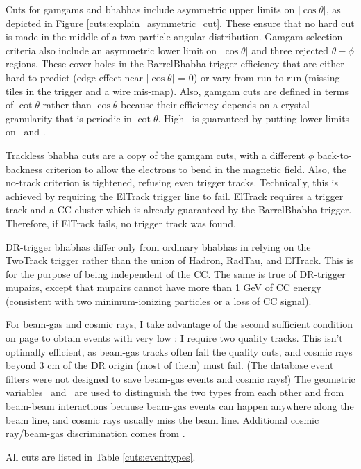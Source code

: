 Cuts for gamgams and bhabhas include asymmetric upper limits on
$|\cos\theta|$, as depicted in Figure \ref{cuts:explain_asymmetric_cut}.
These ensure that no hard cut is made in the middle of a two-particle
angular distribution.  Gamgam selection criteria also include an
asymmetric lower limit on $|\cos\theta|$ and three rejected
$\theta-\phi$ regions.  These cover holes in the BarrelBhabha trigger
efficiency that are either hard to predict (edge effect near
$|\cos\theta|$ = 0) or vary from run to run (missing tiles in the
trigger and a wire mis-map).  Also, gamgam cuts are defined in terms of
$\cot\theta$ rather than $\cos\theta$ because their efficiency depends
on a crystal granularity that is periodic in $\cot\theta$.  High
\hotvisen\ is guaranteed by putting lower limits on \ptwo\ and \etwo.

Trackless bhabha cuts are a copy of the gamgam cuts, with a different
$\phi$ back-to-backness criterion to allow the electrons to bend in
the magnetic field.  Also, the no-track criterion is tightened,
refusing even trigger tracks.  Technically, this is achieved by
requiring the ElTrack trigger line to fail.  ElTrack requires a
trigger track and a CC cluster which is already guaranteed by the
BarrelBhabha trigger.  Therefore, if ElTrack fails, no trigger track
was found.

DR-trigger bhabhas differ only from ordinary bhabhas in relying on the
TwoTrack trigger rather than the union of Hadron, RadTau, and ElTrack.
This is for the purpose of being independent of the CC.  The same is
true of DR-trigger mupairs, except that mupairs cannot have more than
1 GeV of CC energy (consistent with two minimum-ionizing particles or
a loss of CC signal).

For beam-gas and cosmic rays, I take advantage of the second
sufficient condition on page \pageref{wonderfuldiscovery} to obtain
events with very low \hotvisen: I require two quality tracks.  This
isn't optimally efficient, as beam-gas tracks often fail the quality
cuts, and cosmic rays beyond 3 cm of the DR origin (most of them) must
fail.  (The database event filters were not designed to save beam-gas
events and cosmic rays!)  The geometric variables \dxy\ and \dz\ are
used to distinguish the two types from each other and from beam-beam
interactions because beam-gas events can happen anywhere along the
beam line, and cosmic rays usually miss the beam line.  Additional
cosmic ray/beam-gas discrimination comes from \pdotp.

All cuts are listed in Table \ref{cuts:eventtypes}.

